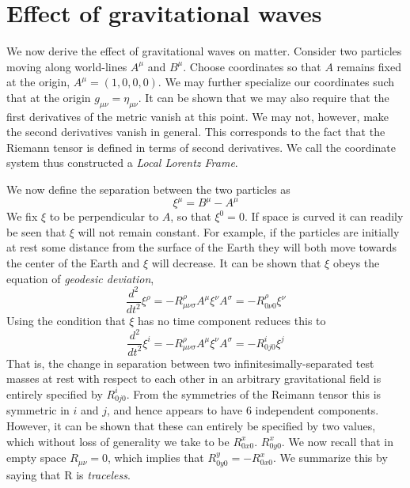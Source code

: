 \section{Effect of gravitational waves}
\label{sec:effects_of_waves}

We now derive the effect of gravitational waves on matter.  Consider
two particles moving along world-lines $A^\mu$ and $B^\mu$.  Choose
coordinates so that $A$ remains fixed at the origin, $A^\mu =
(1,0,0,0)$.  We may further specialize our coordinates such that at
the origin $g_{\mu\nu} = \eta_{\mu\nu}$.  It can be shown that we may
also require that the first derivatives of the metric vanish at this
point.  We may not, however, make the second derivatives vanish in
general.  This corresponds to the fact that the Riemann tensor is
defined in terms of second derivatives.  We call the coordinate system
thus constructed a \emph{Local Lorentz Frame}.

We now define the separation between the two particles as 
%
\begin{equation*}
\xi^\mu = B^\mu - A^\mu
\end{equation*}
%
We fix $\xi$ to be perpendicular to $A$, so that $\xi^0 = 0$.  If space
is curved it can readily be seen that $\xi$ will not remain constant.
For example, if the particles are initially at rest some distance from
the surface of the Earth they will both move towards the center of the
Earth and $\xi$ will decrease.  It can be shown that $\xi$ obeys the
equation of \emph{geodesic deviation},
%
\begin{equation}
\label{eq:geodesic_deviation}
\frac{d^2}{dt^2} \xi^\rho = -R^\rho_{\mu\nu\sigma} A^\mu \xi^\nu A^\sigma
=-R^\rho_{0 \nu 0} \xi^\nu 
\end{equation}
%
Using the condition that $\xi$ has no time component reduces this to 
%
\begin{equation}
\frac{d^2}{dt^2} \xi^i = -R^\rho_{\mu\nu\sigma} A^\mu \xi^\nu A^\sigma
=-R^i_{0 j 0} \xi^j
\end{equation}
%
That is, the change in separation between two
infinitesimally-separated test masses at rest with respect to each
other in an arbitrary gravitational field is entirely specified by
$R^i_{0 j 0}$.  From the symmetries of the Reimann tensor this is
symmetric in $i$ and $j$, and hence appears to have 6 independent
components.  However, it can be shown that these can entirely be
specified by two values, which without loss of generality we take to
be $R^x_{0 x 0}$.  $R^x_{0 y 0}$.  We now recall that in empty space
$R_{\mu\nu} = 0$, which implies that $R^y_{0 y 0} = - R^x_{0 x 0}$.
We summarize this by saying that R is \emph{traceless}.  

